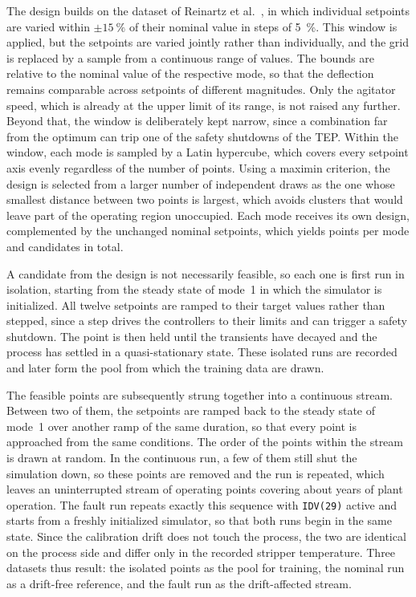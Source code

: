 %
The design builds on the dataset of Reinartz et al.~\cite{reinartz.2021}, in which individual setpoints are varied within $\pm\SI{15}{\percent}$ of their nominal value in steps of \SI{5}{\percent}. This window is applied, but the setpoints are varied jointly rather than individually, and the grid is replaced by a sample from a continuous range of values. The bounds are relative to the nominal value of the respective mode, so that the deflection remains comparable across setpoints of different magnitudes. Only the agitator speed, which is already at the upper limit of its range, is not raised any further. Beyond that, the window is deliberately kept narrow, since a combination far from the optimum can trip one of the safety shutdowns of the TEP. Within the window, each mode is sampled by a Latin hypercube, which covers every setpoint axis evenly regardless of the number of points.
Using a maximin criterion, the design is selected from a larger number of independent draws as the one whose smallest distance between two points is largest, which avoids clusters that would leave part of the operating region unoccupied. Each mode receives its own design, complemented by the unchanged nominal setpoints, which yields \genPointsPerMode{} points per mode and \genCandidates{} candidates in total. \par
%
A candidate from the design is not necessarily feasible, so each one is first run in isolation, starting from the steady state of mode~1 in which the simulator is initialized. All twelve setpoints are ramped to their target values rather than stepped, since a step drives the controllers to their limits and can trigger a safety shutdown. The point is then held until the transients have decayed and the process has settled in a quasi-stationary state. These isolated runs are recorded and later form the pool from which the training data are drawn. \par
%
The feasible points are subsequently strung together into a continuous stream. Between two of them, the setpoints are ramped back to the steady state of mode~1 over another ramp of the same duration, so that every point is approached from the same conditions. 
The order of the points within the stream is drawn at random. In the continuous run, a few of them still shut the simulation down, so these points are removed and the run is repeated, which leaves an uninterrupted stream of \genRunPoints{} operating points covering about \genRunYears{} years of plant operation. The fault run repeats exactly this sequence with \texttt{IDV(29)} active and starts from a freshly initialized simulator, so that both runs begin in the same state. Since the calibration drift does not touch the process, the two are identical on the process side and differ only in the recorded stripper temperature. Three datasets thus result: the isolated points as the pool for training, the nominal run as a drift-free reference, and the fault run as the drift-affected stream. \par
